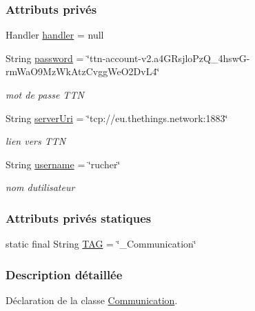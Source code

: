 \subsubsection*{Attributs privés}
\begin{DoxyCompactItemize}
\item 
Handler \hyperlink{classcom_1_1example_1_1bee__honeyt_1_1_communication_add1a0705dba503c1c4c7a3168a571b20}{handler} = null
\item 
String \hyperlink{classcom_1_1example_1_1bee__honeyt_1_1_communication_ace9fdd48d010e4c43cb5d32767207cae}{password} = \char`\"{}ttn-\/account-\/v2.\+a4\+G\+Rsjlo\+Pz\+Q\+\_\+4hswG-\/rm\+Wa\+O9\+Mz\+Wk\+Atz\+Cvgg\+We\+O2\+Dv\+L4\char`\"{}
\begin{DoxyCompactList}\small\item\em mot de passe T\+TN \end{DoxyCompactList}\item 
String \hyperlink{classcom_1_1example_1_1bee__honeyt_1_1_communication_a19b957478f8d8a0d8319e8459d85862e}{server\+Uri} = \char`\"{}tcp\+://eu.\+thethings.\+network\+:1883\char`\"{}
\begin{DoxyCompactList}\small\item\em lien vers T\+TN \end{DoxyCompactList}\item 
String \hyperlink{classcom_1_1example_1_1bee__honeyt_1_1_communication_abfc9c112404b1ddf0fa90587201d5a8f}{username} = \char`\"{}rucher\char`\"{}
\begin{DoxyCompactList}\small\item\em nom d\textquotesingle{}utilisateur \end{DoxyCompactList}\end{DoxyCompactItemize}
\subsubsection*{Attributs privés statiques}
\begin{DoxyCompactItemize}
\item 
static final String \hyperlink{classcom_1_1example_1_1bee__honeyt_1_1_communication_a848338dd9654af654c7e681742666785}{T\+AG} = \char`\"{}\+\_\+\+Communication\char`\"{}
\end{DoxyCompactItemize}


\subsubsection{Description détaillée}
Déclaration de la classe \hyperlink{classcom_1_1example_1_1bee__honeyt_1_1_communication}{Communication}. 

